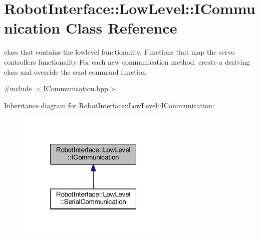 \hypertarget{classRobotInterface_1_1LowLevel_1_1ICommunication}{}\section{Robot\+Interface\+:\+:Low\+Level\+:\+:I\+Communication Class Reference}
\label{classRobotInterface_1_1LowLevel_1_1ICommunication}


class that contains the lowlevel functionality. Functions that map the servo controller\textquotesingle{}s functionality For each new communication method\+: create a deriving class and override the send command function  




{\ttfamily \#include $<$I\+Communication.\+hpp$>$}



Inheritance diagram for Robot\+Interface\+:\+:Low\+Level\+:\+:I\+Communication\+:
\nopagebreak
\begin{figure}[H]
\begin{center}
\leavevmode
\includegraphics[width=208pt]{classRobotInterface_1_1LowLevel_1_1ICommunication__inherit__graph}
\end{center}
\end{figure}
